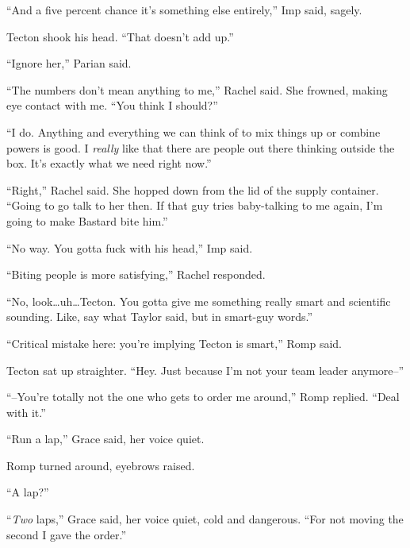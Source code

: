 ``And a five percent chance it's something else entirely,'' Imp said, sagely.



Tecton shook his head.  ``That doesn't add up.''



``Ignore her,'' Parian said.



``The numbers don't mean anything to me,'' Rachel said.  She frowned, making eye contact with me.  ``You think I should?''



``I do.  Anything and everything we can think of to mix things up or combine powers is good.  I \emph{really} like that there are people out there thinking outside the box.  It's exactly what we need right now.''



``Right,'' Rachel said.  She hopped down from the lid of the supply container.  ``Going to go talk to her then.  If that guy tries baby-talking to me again, I'm going to make Bastard bite him.''



``No way.  You gotta fuck with his head,'' Imp said.



``Biting people is more satisfying,'' Rachel responded.



``No, look\ldots uh\ldots Tecton.  You gotta give me something really smart and scientific sounding.  Like, say what Taylor said, but in smart-guy words.''



``Critical mistake here: you're implying Tecton is smart,'' Romp said.



Tecton sat up straighter.  ``Hey.  Just because I'm not your team leader anymore--''



``--You're totally not the one who gets to order me around,'' Romp replied.  ``Deal with it.''



``Run a lap,'' Grace said, her voice quiet.



Romp turned around, eyebrows raised.



``A lap?''



``\emph{Two }laps,'' Grace said, her voice quiet, cold and dangerous.  ``For not moving the second I gave the order.''



